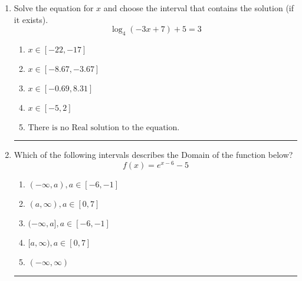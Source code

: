 \documentclass[14pt]{extbook}
\newcommand{\litem}[1]{\item#1\hspace*{-1cm}\rule{\textwidth}{0.4pt}}
\begin{document}
\begin{enumerate}
{\begin{enumerate}[label=\Alph*.]
\end{enumerate} }
\litem{
Solve the equation for $x$ and choose the interval that contains the solution (if it exists).\[ \log_{4}{(-3x+7)}+5 = 3 \]\begin{enumerate}[label=\Alph*.]
\item \( x \in [-22, -17] \)
\item \( x \in [-8.67, -3.67] \)
\item \( x \in [-0.69, 8.31] \)
\item \( x \in [-5, 2] \)
\item \( \text{There is no Real solution to the equation.} \)

\end{enumerate} }
\litem{
Which of the following intervals describes the Domain of the function below?\[ f(x) = e^{x-6}-5 \]\begin{enumerate}[label=\Alph*.]
\item \( (-\infty, a), a \in [-6, -1] \)
\item \( (a, \infty), a \in [0, 7] \)
\item \( (-\infty, a], a \in [-6, -1] \)
\item \( [a, \infty), a \in [0, 7] \)
\item \( (-\infty, \infty) \)

\end{enumerate} }
\end{enumerate}
\end{document}
